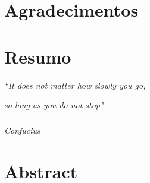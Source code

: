\fancyfoot[C]{\thepage}

\begin{titlepage}
    
    
    
\end{titlepage}

\setcounter{page}{2}


\chapter*{Agradecimentos}






 \chapter*{Resumo}
 
%

\vspace*{\fill}
\begin{flushright}

\textit{ “It does not matter how slowly you go,}

\textit{ so long as you do not stop" }

\paragraph{}
\textit{Confucius}
\end{flushright}




 \chapter*{Abstract}
 
%

